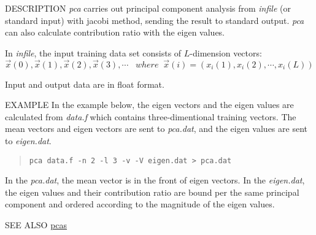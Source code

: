 \begin{synopsis}
 \item[pca] [ --l $L$ ] [ --n $N$] [ --i $I$] [ --e $e$]
 [ --v ]  [ --V $fn$ ] [ {\em infile} ] 
\end{synopsis}

\begin{qsection}{DESCRIPTION}
 {\em pca} carries out principal component analysis
 from {\em infile} (or standard input) with jacobi method,
 sending the result to standard output.
 {\em pca} can also calculate contribution ratio with the eigen values.

 In {\em infile},
 the input training data set consists of $L$-dimension vectors:
 \[
 \Vec{x}(0), \Vec{x}(1), \Vec{x}(2), \Vec{x}(3), \cdots \;\;\;
 where\;\;\Vec{x}(i) = (x_{i}(1), x_{i}(2), \cdots, x_{i}(L))
 \]

Input and output data are in float format. 
\end{qsection}

\begin{options}
\end{options}

\begin{qsection}{EXAMPLE}
 In the example below,
 the eigen vectors and the eigen values are
 calculated  from {\em data.f}
 which contains three-dimentional training vectors.
 The mean vectors and eigen vectors are sent to
 {\em pca.dat}, and the eigen values are sent to {\em eigen.dat}.
\begin{quote}
  \verb!pca data.f -n 2 -l 3 -v -V eigen.dat > pca.dat!
\end{quote} 
In the {\em pca.dat}, the mean vector is in the front of
eigen vectors.
In the {\em eigen.dat}, 
the eigen values and their contribution ratio are bound per
the same principal component and ordered according to the
magnitude of the eigen values.
\end{qsection} 
\begin{qsection}{SEE ALSO}
 \hyperlink{pcas}{pcas}
\end{qsection}
